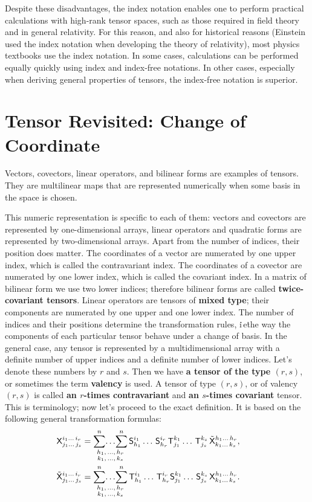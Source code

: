 Despite these disadvantages, the index notation enables one to perform
practical calculations with high-rank tensor spaces, such as those
required in field theory and in general relativity. For this reason,
and also for historical reasons (Einstein used the index notation
when developing the theory of relativity), most physics textbooks
use the index notation. In some cases, calculations can be performed
equally quickly using index and index-free notations. In other cases,
especially when deriving general properties of tensors, the index-free
notation is superior.%


\section{Tensor Revisited: Change of Coordinate}

Vectors, covectors, linear operators, and bilinear forms
are examples of tensors.  They are multilinear maps that are
represented numerically when some basis in the space is chosen.

This numeric representation is specific to each of them: vectors
and covectors are represented by one-dimensional arrays, linear
operators and quadratic forms are represented by two-dimensional
arrays. Apart from the number of indices, their position does
matter. The coordinates of a vector are numerated by one upper 
index, which is called the contravariant index. The coordinates of
a covector are numerated by one lower index, which is called the 
covariant index. In a matrix of bilinear form we
use two lower indices; therefore bilinear forms are called
\textbf{twice-covariant tensors}. Linear operators are tensors
of \textbf{mixed type}; their components are numerated by one upper
and one lower index. The number of indices and their positions
determine the transformation rules, i\.\,e\. the way the components
of each particular tensor behave under a change of basis. In the
general case, any tensor is represented by a multidimensional
array with a definite number of upper indices and a definite number
of lower indices. Let's denote these numbers by $r$ and $s$.
Then we have \textbf{a tensor of the type $(r,s)$}, or sometimes the
term \textbf{valency} is used. A tensor of type $(r,s)$, or of valency
$(r,s)$ is called \textbf{an $r$-times contravariant} and
\textbf{an $s$-times covariant} tensor. This is terminology; now let's
proceed to the exact definition. It is based on the following general
transformation formulas:
\begin{align}
&\hskip -2em
\tsor{X}^{i_1\dots\,i_r}_{j_1\dots\,j_s}=\multsum \tsor{S}^{i_1}_{h_1}\dots\,\tsor{S}^{i_r}_{h_r}\tsor{T}^{k_1}_{j_1}
\dots\,\tsor{T}^{k_s}_{j_s}\,\tilde{ \tsor{X}}^{h_1\dots\,h_r}_{k_1\dots\,k_s},
\label{12.1}\\
&\hskip -2em
\tilde{\tsor{X}}^{i_1\dots\,i_r}_{j_1\dots\,j_s}=\multsum \tsor{T}^{i_1}_{h_1}\dots\,\tsor{T}^{i_r}_{h_r}\tsor{S}^{k_1}_{j_1}
\dots\,\tsor{S}^{k_s}_{j_s}\,\tsor{X}^{h_1\dots\,h_r}_{k_1\dots\,k_s}.
\label{12.2}
\end{align}


